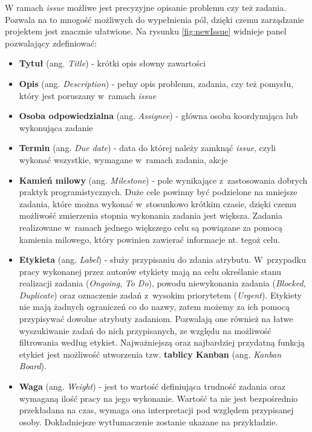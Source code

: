 W ramach \textit{issue} możliwe jest precyzyjne opisanie problemu czy też zadania. Pozwala na to mnogość możliwych do wypełnienia pól, dzięki czemu zarządzanie projektem jest znacznie ułatwione. Na rysunku \ref{fig:newIssue} widnieje panel pozwalający zdefiniować:
\begin{itemize}
\item \textbf{Tytuł} (ang. \textit{Title}) - krótki opis słowny zawartości
\item \textbf{Opis} (ang. \textit{Description}) - pełny opis problemu, zadania, czy też pomysłu, który jest poruszany w~ramach \textit{issue}
\item \textbf{Osoba odpowiedzialna} (ang. \textit{Assignee}) - główna osoba koordynująca lub wykonująca zadanie
\item \textbf{Termin} (ang. \textit{Due date}) - data do której należy zamknąć \textit{issue}, czyli wykonać wszystkie, wymagane w~ramach zadania, akcje
\item \textbf{Kamień milowy} (ang. \textit{Milestone}) - pole wynikające z~zastosowania dobrych praktyk programistycznych. Duże cele powinny być podzielone na mniejsze zadania, które można wykonać w~stosunkowo krótkim czasie, dzięki czemu możliwość zmierzenia stopnia wykonania zadania jest większa. Zadania realizowane w~ramach jednego większego celu są powiązane za pomocą kamienia milowego, który powinien zawierać informacje nt. tegoż celu.
\item \textbf{Etykieta} (ang. \textit{Label}) - służy przypisaniu do zdania atrybutu. W~przypadku pracy wykonanej przez autorów etykiety mają na celu określanie stanu realizacji zadania (\textit{Ongoing}, \textit{To Do}), powodu niewykonania zadania (\textit{Blocked}, \textit{Duplicate}) oraz oznaczenie zadań z~wysokim priorytetem (\textit{Urgent}). Etykiety nie mają żadnych ograniczeń co do nazwy, zatem możemy za ich pomocą przypisywać dowolne atrybuty zadaniom. Pozwalają one również na łatwe wyszukiwanie zadań do nich przypisanych, ze względu na możliwość filtrowania według etykiet. Najważniejszą oraz najbardziej przydatną funkcją etykiet jest możliwość utworzenia tzw. \textbf{tablicy Kanban} (ang. \textit{Kanban Board}).
\item \textbf{Waga} (ang. \textit{Weight}) - jest to wartość definiująca trudność zadania oraz wymaganą ilość pracy na jego wykonanie. Wartość ta nie jest bezpośrednio przekładana na czas, wymaga ona interpretacji pod względem przypisanej osoby. Dokładniejsze wytłumaczenie zostanie ukazane na przykładzie.
\end{itemize}

